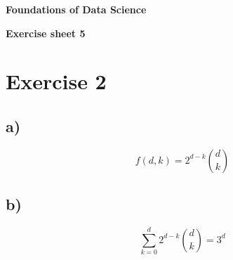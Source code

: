 \documentclass[a4paper,10pt]{article}
\begin{document}
\centerline{\Large\bfseries  Foundations of Data Science }
\centerline{\bfseries  Exercise sheet 5}


\section*{Exercise 2}
\subsection*{a)}
\[f(d,k)= 2^{d-k} {{d}\choose{k}}\]
\subsection*{b)}
\[\sum_{k=0}^d 2^{d-k} {{d}\choose{k}} = 3^d \]
\end{document}
